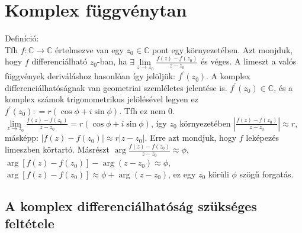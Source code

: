 \documentclass[12pt,a4paper]{scrartcl}
\newenvironment{definicio}{}{}
\begin{document}
\hypertarget{komplex-fuggvenytan}{%
\section{Komplex függvénytan}\label{komplex-fuggvenytan}}

\begin{definicio}

Definíció:\\
Tfh \(\left. f:{\mathbb{C}}\rightarrow{\mathbb{C}} \right.\) értelmezve
van egy \(z_{0} \in {\mathbb{C}}\) pont egy környezetében. Azt monjduk,
hogy \(f\) differenciálható \(z_{0}\)-ban, ha
\(\exists\lim\limits_{z\rightarrow z_{0}}\frac{f\left( z \right) - f\left( z_{0} \right)}{z - z_{0}}\)
és véges. A limeszt a valós függvények deriváláshoz hasonlóan így
jelöljük: \(f^{\prime}\left( z_{0} \right)\). A komplex
differenciálhatóságnak van geometriai szemléletes jelentése is.
\(f^{\prime}\left( z_{0} \right) \in {\mathbb{C}}\), és a komplex számok
trigonometrikus jelölésével legyen ez
\(f^{\prime}\left( z_{0} \right): = r\left( {\cos\phi + i\sin\phi} \right)\).
Tfh ez nem 0.
\(\lim\limits_{z\rightarrow z_{0}}\frac{f\left( z \right) - f\left( z_{0} \right)}{z - z_{0}} = r\left( {\cos\phi + i\sin\phi} \right)\),
így \(z_{0}\) környezetében
\(\left| \frac{f\left( z \right) - f\left( z_{0} \right)}{z - z_{0}} \right| \approx r\),
másképp:
\(\left| {f\left( z \right) - f\left( z_{0} \right)} \right| \approx r\left| {z - z_{0}} \right|\).
Erre azt mondjuk, hogy \(f\) leképezés limeszben körtartó. Másrészt
\(\arg\frac{f\left( z \right) - f\left( z_{0} \right)}{z - z_{0}} \approx \phi\),
\(\arg\left\lbrack {f\left( z \right) - f\left( z_{0} \right)} \right\rbrack - \arg\left( {z - z_{0}} \right) \approx \phi\),
\(\arg\left\lbrack {f\left( z \right) - f\left( z_{0} \right)} \right\rbrack \approx \phi + \arg\left( {z - z_{0}} \right)\),
ez egy \(z_{0}\) körüli \(\phi\) szögű forgatás.

\end{definicio}

\hypertarget{a-komplex-differencialhatosag-szukseges-feltetele}{%
\subsection{A komplex differenciálhatóság szükséges
feltétele}\label{a-komplex-differencialhatosag-szukseges-feltetele}}
\end{document}
